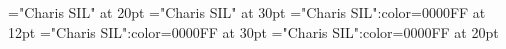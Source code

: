 \documentclass[a4paper]{article}
\begin{document}
\pagestyle{plain}
\sloppy
\setlength{\parfillskip}{0pt plus 1fil}
\font\xitemen="Charis SIL" at 20pt
\font\xitempt="Charis SIL" at 30pt
\font\entry="Charis SIL":color=0000FF at 12pt
\font\xitemptentry="Charis SIL":color=0000FF at 30pt
\font\xitemenentry="Charis SIL":color=0000FF at 20pt

\pagestyle{fancy} 

\end{document}
